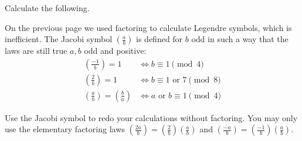 \documentclass[12pt]{exam}
\begin{document}
\begin{questions}
  Calculate the following.
  \newpage
  \question On the previous page we used factoring to calculate Legendre symbols, which is inefficient. The Jacobi symbol $(\frac ab)$ is defined for $b$ odd in such a way that the laws are still true $a,b$ odd and positive:
  \begin{align*}
    \left(\frac{-1}b\right)=1\quad&\iff b\equiv1\pmod{4}\\
    \left(\frac2b\right)=1\quad&\iff b\equiv\text{$1$ or $7$}\pmod{8}\\
    \left(\frac ab\right)=\left(\frac ba\right)&\iff a\text{ or }b\equiv1\pmod{4}
  \end{align*}
  
  Use the Jacobi symbol to redo your calculations without factoring. You may only use the elementary factoring laws $(\frac{2a}{b})=(\frac2b)(\frac ab)$ and $(\frac{-a}{b})=(\frac{-1}{b})(\frac ab)$.
\end{questions}
\end{document}
